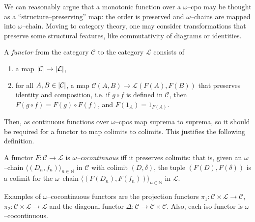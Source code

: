 We can reasonably argue that a monotonic function over a \(\omega\)--cpo may be thought as a ``structure--preserving'' map: the order is preserved and \(\omega\)--chains are mapped into \(\omega\)--chain. %
Moving to category theory, one may consider transformations that preserve some structural features, like commutativity of diagrams or identities.

\begin{dfn}
  A \emph{functor} from the category \(\mathcal{C}\) to the category \(\mathcal{L}\) consists of
  \begin{enumerate}
    \item a map \(\lvert \mathcal{C} \rvert \to \lvert \mathcal{L} \rvert\),
    \item for all \(A, B \in \lvert \mathcal{C} \rvert\), a map \(\mathcal{C}(A,B) \to \mathcal{L}(F(A),F(B))\) that preserves identity and composition, i.e.
      if \(g \circ f\) is defined in \(\mathcal{C}\), then
            \(F(g \circ f) = F(g) \circ F(f)\), and
            \(F(1_A) = 1_{F(A)}\).
  \end{enumerate}
\end{dfn}


Then, as continuous functions over \(\omega\)--cpos map suprema to suprema, so it should be required for a functor to map colimits to colimits. This justifies the following definition. %

\begin{dfn}
  A functor \(F \colon \mathcal{C} \to \mathcal{L}\) is \emph{\(\omega\)--cocontinuous} iff it preserves colimits: that is, given an \(\omega\)--chain \({\langle (D_n,f_n) \rangle}_{n \in \mathbb{N}}\) in \(\mathcal{C}\) with colimit \((D,\delta)\), the tuple \((F(D),F(\delta))\) is a colimit for the \(\omega\)--chain \({\langle (F(D_n),F(f_n))\rangle}_{n \in \mathbb{N}}\) in \(\mathcal{L}\). %
\end{dfn}

Examples of \(\omega\)--cocontinuous functors are the projection functors \(\pi_1 \colon \mathcal{C} \times \mathcal{L} \to \mathcal{C}\), \(\pi_2 \colon \mathcal{C} \times \mathcal{L} \to \mathcal{L}\) and the diagonal functor \(\Delta \colon \mathcal{C} \to \mathcal{C} \times \mathcal{C}\). %
Also, each iso functor is \(\omega\)--cocontinuous. %

